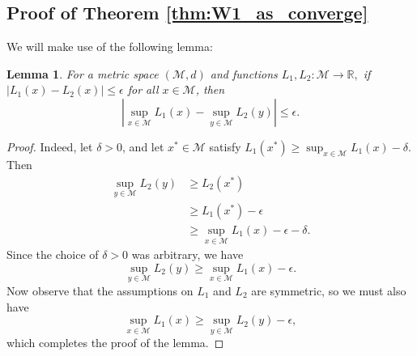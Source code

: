 \documentclass[12pt]{article}
\newcommand{\RR}{\mathbb{R}}
\newcommand{\EE}{\mathbb{E}}
\newtheorem{lemma}{Lemma}
\theoremstyle{definition}
\begin{document}
\subsection{Proof of Theorem \ref{thm:W1_as_converge}}
We will make use of the following lemma: 
\begin{lemma}
\label{lem:supsclose}
For a metric space $(\mathcal{M},d)$ and functions $L_1,L_2: \mathcal{M}\rightarrow\RR, $ if $|L_1(x)-L_2(x)|\leq \epsilon$ for all $x\in\mathcal{M}$, then 
$$\left| \sup_{x\in\mathcal{M}} L_1(x) - \sup_{y\in\mathcal{M}} L_2(y)\right|\leq \epsilon.$$
\end{lemma}
\begin{proof}
Indeed, let $\delta>0$, and let $x^*\in\mathcal{M}$ satisfy $L_1(x^*) \geq \sup_{x\in\mathcal{M}} L_1(x)-\delta$. Then 
\begin{align*}
\sup_{y\in \mathcal{M}} L_2(y) & \geq L_2(x^*)\\
&\geq L_1(x^*)-\epsilon\\
&\geq \sup_{x\in \mathcal{M}} L_1(x) - \epsilon - \delta.
\end{align*}
Since the choice of $\delta>0$ was arbitrary, we have
$$ \sup_{y\in \mathcal{M}} L_2(y) \geq \sup_{x\in \mathcal{M}}L_1(x)-\epsilon.$$ Now observe that the assumptions on $L_1$ and $L_2$ are symmetric, so we must also have 
$$ \sup_{x\in \mathcal{M}} L_1(x) \geq \sup_{y\in \mathcal{M}} L_2(y) - \epsilon,$$ which completes the proof of the lemma.
\end{proof}

\end{document}
